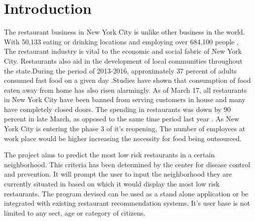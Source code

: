\documentclass[11pt]{report}
\begin{document}
 

\chapter{Introduction}

\par 
The restaurant business in New York City is unlike other business in the world. With 50,133 eating or drinking locations \cite{restaurants_statistics} and employing over 684,100 people \cite{restaurants_statistics} , The restaurant industry is vital to the economic and social fabric of New York City. Restaurants also aid in the development of local communities throughout the state.During the period of 2013-2016, approximately 37 percent of adults consumed fast food on a given day \cite{fastfood_percent:paper}.Studies have shown that consumption of food eaten away from home has also risen alarmingly. As of March 17, all restaurants in New York City have been banned from serving customers in house and many have completely closed doors. The spending in restaurants was down by 90 percent in late March, as opposed to the same time period last year \cite{NewYorkBudget:paper}. As New York City is entering the phase 3 of it's reopening, The number of employees at work place would be higher increasing the necessity for food being outsourced. 
\par The project aims to predict the most low risk restaurants in a certain neighborhood. This criteria has been determined by the center for disease control and prevention. It will prompt the user to input the neighborhood they are currently situated in based on which it would display the most low risk restaurants. The program devised can be used as a stand alone application or be integrated with existing restaurant  recommendation systems. It's user base is not limited to any sect, age or category of citizens.
\end{document}
